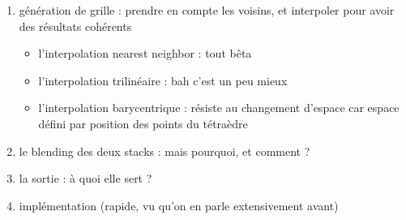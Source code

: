 {\begin{enumerate}
\begin{enumerate}
			\item génération de grille : prendre en compte les voisins, et interpoler pour avoir des résultats cohérents~\begin{itemize}
				\item l'interpolation nearest neighbor : tout bêta
				\item l'interpolation trilinéaire : bah c'est un peu mieux
				\item l'interpolation barycentrique : résiste au changement d'espace car espace défini par position des points du tétraèdre
			\end{itemize}
			\item le blending des deux stacks : mais pourquoi, et comment ?
			\item la sortie : à quoi elle sert ?
			\item implémentation (rapide, vu qu'on en parle extensivement avant)
		\end{enumerate}
	\end{enumerate}
}

